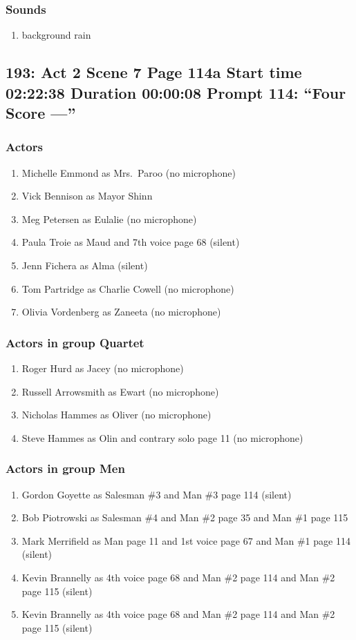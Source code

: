 \subsubsection{Sounds}
\begin{enumerate}
\item background rain
\end{enumerate}
\subsection{193: Act 2 Scene 7 Page 114a Start time 02:22:38 Duration 00:00:08 Prompt 114: ``Four Score ---''}

\subsubsection{Actors}
\begin{enumerate}
\item Michelle Emmond as Mrs.~Paroo (no microphone)
\item Vick Bennison as Mayor Shinn
\item Meg Petersen as Eulalie (no microphone)
\item Paula Troie as Maud and 7th voice page 68 (silent)
\item Jenn Fichera as Alma (silent)
\item Tom Partridge as Charlie Cowell (no microphone)
\item Olivia Vordenberg as Zaneeta (no microphone)
\end{enumerate}
\subsubsection{Actors in group Quartet}
\begin{enumerate}
\item Roger Hurd as Jacey (no microphone)
\item Russell Arrowsmith as Ewart (no microphone)
\item Nicholas Hammes as Oliver (no microphone)
\item Steve Hammes as Olin and contrary solo page 11 (no microphone)
\end{enumerate}
\subsubsection{Actors in group Men}
\begin{enumerate}
\item Gordon Goyette as Salesman \#3 and Man \#3 page 114 (silent)
\item Bob Piotrowski as Salesman \#4 and Man \#2 page 35 and Man \#1 page 115
\item Mark Merrifield as Man page 11 and 1st voice page 67 and Man \#1 page 114 (silent)
\item Kevin Brannelly as 4th voice page 68 and Man \#2 page 114 and Man \#2 page 115 (silent)
\item Kevin Brannelly as 4th voice page 68 and Man \#2 page 114 and Man \#2 page 115 (silent)
\end{enumerate}
